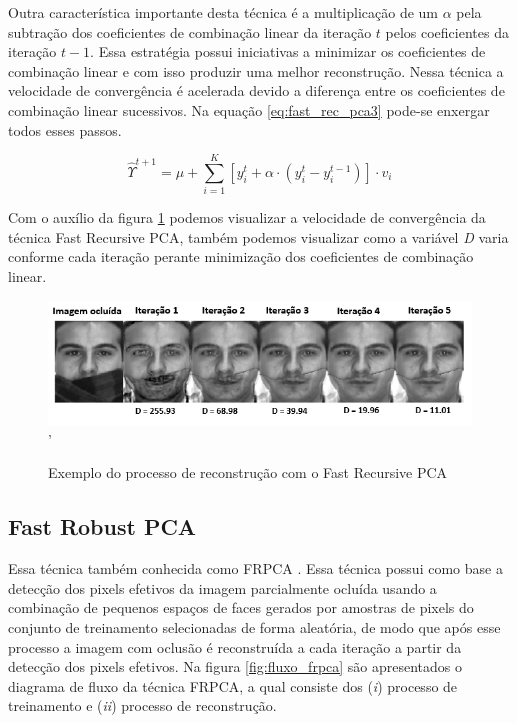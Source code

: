 Outra característica importante desta técnica é a multiplicação de um $\alpha$ pela subtração dos coeficientes de combinação linear da iteração $t$ pelos coeficientes da iteração $t-1$. Essa estratégia possui iniciativas a minimizar os coeficientes de combinação linear e com isso produzir uma melhor reconstrução. Nessa técnica a velocidade de convergência é acelerada devido a diferença entre os coeficientes de combinação linear sucessivos. Na equação \ref{eq:fast_rec_pca3} pode-se enxergar todos esses passos.

\begin{equation}
\label{eq:fast_rec_pca3}
\hat{\Upsilon}^{t+1} = \mu + \sum_{i=1}^{K}\left [ y_i^t + \alpha \cdot(y_i^t - y_i^{t-1}) \right ] \cdot v_i
\end{equation}



Com o auxílio da figura \ref{fig:fast_rec_pca} podemos visualizar a velocidade de convergência da técnica Fast Recursive PCA, também podemos visualizar como a variável \textit{D} varia conforme cada iteração perante minimização dos coeficientes de combinação linear.

\begin{figure}[H]
\centering
\caption{Exemplo do processo de reconstrução com o Fast Recursive PCA}
\includegraphics[scale=0.80]{imgs/fast_recursive_pca.png}
'
\label{fig:fast_rec_pca}
\end{figure}


\subsection{Fast Robust PCA}
Essa técnica também conhecida como FRPCA \cite{storer2009fast}. Essa técnica possui como base a detecção dos pixels efetivos da imagem parcialmente ocluída usando a combinação de pequenos espaços de faces gerados por amostras de pixels do conjunto de treinamento selecionadas de forma aleatória, de modo que após esse processo a imagem com oclusão é reconstruída a cada iteração a partir da detecção dos pixels efetivos. Na figura \ref{fig:fluxo_frpca} são apresentados o diagrama de fluxo da técnica FRPCA, a qual consiste dos (\textit{i}) processo de treinamento e (\textit{ii}) processo de reconstrução.


